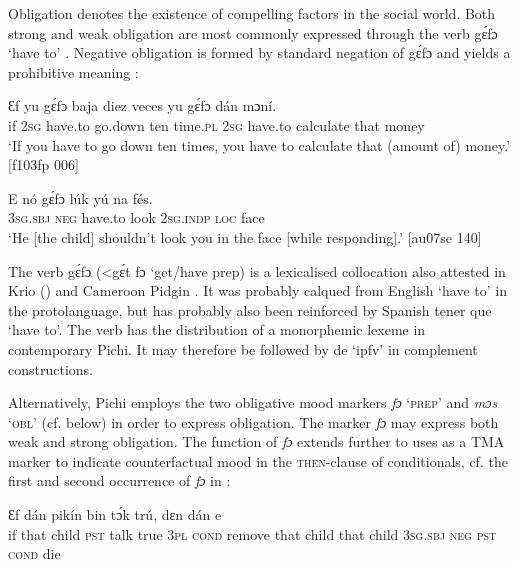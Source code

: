 Obligation denotes the existence of compelling factors in the social world. Both strong and weak obligation are most commonly expressed through the verb gɛ́fɔ ‘have to’ . Negative obligation is formed by standard negation of gɛ́fɔ and yields a prohibitive{\fff} meaning : 


\ea%
    \label{ex:key:414}
    \gll Ɛf  yu  gɛ́fɔ    baja    diez  veces  yu  gɛ́fɔ
    dán  mɔní.\\
if  \textsc{2sg}  have.to  go.down  ten  time.\textsc{pl}  \textsc{2sg}  have.to  
calculate    that  money\\

\glt ‘If you have to go down ten times, you have to calculate that 
(amount of) money.’ [f103fp 006]
\z


\ea%
    \label{ex:key:415}
    \gll E    nó  gɛ́fɔ    lúk    yú    na  fés.\\
\textsc{3sg.sbj}  \textsc{neg}  have.to  look    \textsc{2sg.indp}  \textsc{loc}  face\\

\glt ‘He [the child] shouldn’t look you in the face [while responding].’ [au07se 140]
\z

The verb gɛ́fɔ (<gɛ́t fɔ ‘get/have prep) is a lexicalised collocation also attested in Krio (\citealt{FyleJones1980}) and Cameroon Pidgin \citep{Nkengasong2016}. It was probably calqued from English ‘have to’ in the protolanguage, but has probably also been reinforced by Spanish tener que ‘have to’. The verb has the distribution of a monorphemic lexeme in contemporary Pichi. It may therefore be followed by de ‘ipfv’ in complement constructions. 


Alternatively, Pichi employs the two obligative mood markers \textit{fɔ} ‘\textsc{prep}’  and \textit{mɔs} ‘\textsc{obl}’ (cf.  below) in order to express obligation. The marker \textit{fɔ} may express both weak and strong obligation. The function of \textit{fɔ} extends further to uses as a TMA marker to indicate counterfactual mood in the \textsc{then-}clause of conditionals, cf. the first and second occurrence of \textit{fɔ} in :



\ea%
    \label{ex:key:416}
\gll
Ɛf  dán    pikín  bin  tɔ́k  trú,    dɛn         dán  
  e  \textstylePichiexamplenumberZchnZchn{}     \\
if  that    child  \textsc{pst}  talk  true    \textsc{3pl}  \textsc{cond}    remove  that child 
that    child  \textsc{3sg.sbj}  \textsc{neg}  \textsc{pst}  \textsc{cond}    die\\

